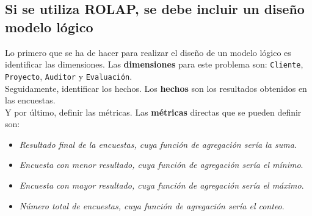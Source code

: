\medskip
\subsection{Si se utiliza ROLAP, se debe incluir un diseño modelo lógico}
\label{08}
Lo primero que se ha de hacer para realizar el diseño de un modelo lógico es identificar las dimensiones. Las \textbf{dimensiones} para este problema son: \texttt{Cliente}, \texttt{Proyecto}, \texttt{Auditor} y \texttt{Evaluación}. \\

Seguidamente, identificar los hechos. Los \textbf{hechos} son los resultados obtenidos en las encuestas. \\

Y por último, definir las métricas. Las \textbf{métricas} directas que se pueden definir son: 
\begin{itemize}
 \item \textit{Resultado final de la encuestas, cuya función de agregación sería la suma}.
 \item \textit{Encuesta con menor resultado, cuya función de agregación sería el mínimo}.
 \item \textit{Encuesta con mayor resultado, cuya función de agregación sería el máximo}. 
 \item \textit{Número total de encuestas, cuya función de agregación sería el conteo}. 
\end{itemize}

